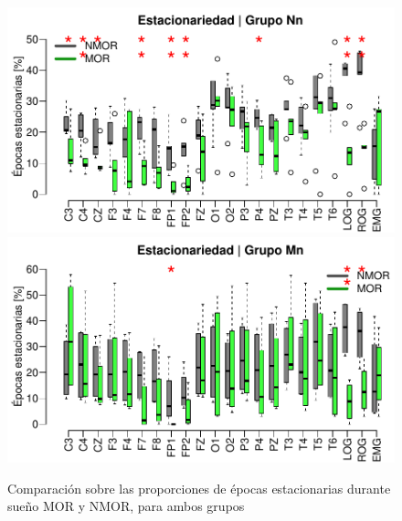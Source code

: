 \begin{figure}
\centering
\includegraphics[width=\linewidth]
{./img_ejemplos/Comparacion_etapas_normal_MOR_vs_NMOR_v2.pdf} \\
\includegraphics[width=\linewidth]
{./img_ejemplos/Comparacion_etapas_pdc_MOR_vs_NMOR_v2.pdf} \\
\caption{Comparación sobre las proporciones de épocas estacionarias durante sueño MOR y NMOR, para 
ambos grupos}
\label{comparacion_verde}
\end{figure}

